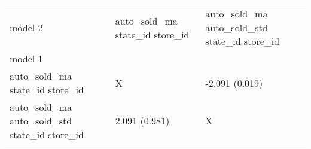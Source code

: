 \begin{tabular}{lll}
\toprule
model 2 & auto_sold_ma state_id store_id & auto_sold_ma auto_sold_std state_id store_id \\
model 1 &  &  \\
\midrule
auto_sold_ma state_id store_id & X & \cellcolor{green} -2.091 (0.019) \\
auto_sold_ma auto_sold_std state_id store_id & 2.091 (0.981) & X \\
\bottomrule
\end{tabular}
